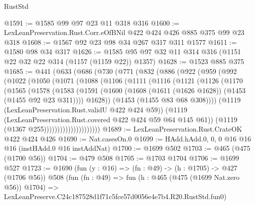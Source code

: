 \begin{lexlean}{RustStd}
\begin{coremodule}
@1591 := @1585 @99 @97 @23 @11 @318 @316
@1600 := LexLeanPreservation.Rust.Corr.eOfBNil @422 @424 @426 @885 @375 @99 @23 @318
@1608 := @1567 @92 @23 @98 @34 @267 @317 @311 @1577
@1611 := @1580 @98 @34 @317
@1626 := @1585 @95 @97 @32 @11 @314 @316 (@1151 @22 @32 @22 @314 (@1157 (@1159 @22)) @1357)
@1628 := @1523 @885 @375
@1685 := @441
    (@633
      (@686
        (@730
          (@771
            (@832
              (@886
                (@922
                  (@959
                    (@992
                      (@1022
                        (@1050
                          (@1071
                            (@1088
                              (@1106
                                (@1111
                                  (@1116
                                    (@1121
                                      (@1126
                                        (@1170
                                          (@1565
                                            (@1578
                                              (@1583
                                                (@1591
                                                  (@1600
                                                    (@1608
                                                      (@1611 (@1626 @1628))
                                                      (@1453 (@1455 @92 @23 @311))))
                                                  @1628))
                                              (@1453 (@1455 @83 @68 @308))))
                                          (@1119 (LexLeanPreservation.Rust.validU @422 @424 @59))
                                          (@1119
                                            (LexLeanPreservation.Rust.covered
                                              @422
                                              @424
                                              @59
                                              @64
                                              @145
                                              @61))
                                          (@1119 (@1367 @255)))))))))))))))))))))
@1689 := LexLeanPreservation.Rust.CrateOK @422 @424 @426
@1690 := Nat.casesOn.{0}
@1699 := HAdd.hAdd.{0, 0, 0} @16 @16 @16 (instHAdd.{0} @16 instAddNat)
@1700 := @1699 @502
@1703 := @465 (@475 (@1700 @56))
@1704 := @479 @508
@1705 := @1703 @1704
@1706 := @1699 @527
@1723 := @1690
    (fun (y : @16) => (fn : @49) -> (h : @1705) -> @427 (@1706 @56))
    @508
    (fun (fn : @49) =>
    fun (h : @465 (@475 (@1699 Nat.zero @56)) @1704) =>
    LexLeanPreserve.C24c187528d1f71c5fce57d0056e4e7b4.R20.RustStd.fun0)

\end{coremodule}
\end{lexlean}
